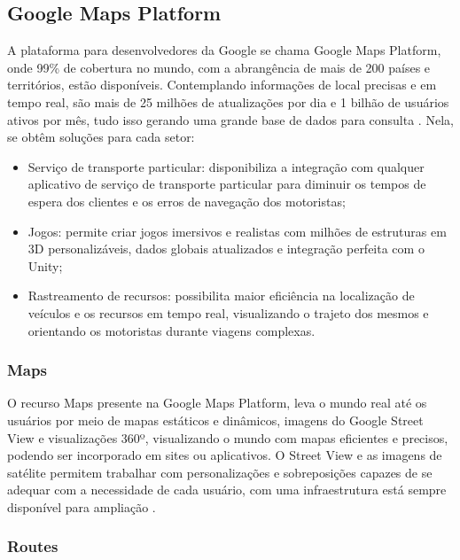 \subsection{Google Maps Platform}

A plataforma para desenvolvedores da Google se chama Google Maps Platform, onde 99\% de cobertura no mundo, com a abrangência de mais de 200 países e territórios, estão disponíveis. Contemplando informações de local precisas e em tempo real, são mais de 25 milhões de atualizações por dia e 1 bilhão de usuários ativos por mês, tudo isso gerando uma grande base de dados para consulta \cite{google:2019}. Nela, se obtêm soluções para cada setor:
\begin{itemize}
    \item Serviço de transporte particular: disponibiliza a integração com qualquer aplicativo de serviço de transporte particular para diminuir os tempos de espera dos clientes e os erros de navegação dos motoristas;
    \item Jogos: permite criar jogos imersivos e realistas com milhões de estruturas em 3D personalizáveis, dados globais atualizados e integração perfeita com o Unity;
    \item Rastreamento de recursos: possibilita maior eficiência na localização de veículos e os recursos em tempo real, visualizando o trajeto dos mesmos e orientando os motoristas durante viagens complexas. 
\end{itemize}

\subsubsection{Maps}

O recurso Maps presente na Google Maps Platform, leva o mundo real até os usuários por meio de mapas estáticos e dinâmicos, imagens do Google Street View e visualizações 360º, visualizando o mundo com mapas eficientes e precisos, podendo ser incorporado em sites ou aplicativos. O Street View e as imagens de satélite permitem  trabalhar com personalizações e sobreposições capazes de se adequar com a necessidade de cada usuário, com uma infraestrutura está sempre disponível para ampliação \cite{google:2019}. 

\subsubsection{Routes}

